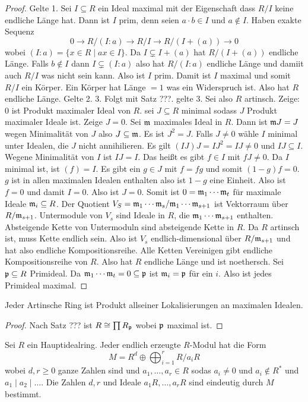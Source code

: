 \begin{proof}
    Gelte 1. Sei $I\subseteq R$ ein Ideal maximal mit der Eigenschaft dass $R/I$ keine endliche Länge hat. Dann ist $I$ prim, denn seien $a\cdot b\in I$ und $a\not\in I$. Haben exakte Sequenz
    $$0\to R/(I:a)\to R/I\to R/(I+(a))\to 0$$ wobei $(I:a)=\{x\in R\mid ax\in I\}$. Da $I\subsetneq I+(a)$ hat $R/(I+(a))$ endliche Länge. Falls $b\not\in I$ dann $I\subsetneq (I:a)$ also hat $R/(I:a)$ endliche Länge und damiit auch $R/I$ was nicht sein kann. Also ist $I$ prim. Damit ist $I$ maximal und somit $R/I$ ein Körper. Ein Körper hat Länge $=1$ was ein Widerspruch ist.
    Also hat $R$ endliche Länge.
    Gelte 2. 3. Folgt mit Satz ???. gelte 3. Sei also $R$ artinsch. Zeige: $0$ ist Produkt maximaler Ideal von $R$.
    sei $J\subseteq R$ minimal sodass $J$ Produkt maximaler Ideale ist. Zeige $J=0$.
    Sei $\mathfrak{m} $ maximales Ideal in $R$. Dann ist $\mathfrak{m} J=J$ wegen Minimalität von $J$ also $J\subseteq \mathfrak{m}$. Es ist $J^2=J$.
    Falls $J\neq 0$ wähle $I$ minimal unter Idealen, die $J$ nicht annihilieren.
    Es gilt $(IJ)J=IJ^2=IJ\neq 0$ und $IJ\subseteq I$. Wegene Minimalität von $I$ ist $IJ=I$. Das heißt es gibt $f\in I$ mit $fJ\neq 0$. Da $I$ minimal ist, ist $(f)=I$. Es gibt ein $g\in J$ mit $f=fg$ und somit $(1-g)f=0$.
    $g$ ist in allen maximalen Idealen enthalten also ist $1-g$ eine Einheit. Also ist $f=0$ und damit $I=0$. Also ist $J=0$.
    Somit ist $0=\mathfrak{m}_1\cdots \mathfrak{m}_t$ für maximale Ideale $\mathfrak{m}_i\subseteq R$.
    Der Quotient $V_S=\mathfrak{m}_1\cdots \mathfrak{m}_s/\mathfrak{m}_1\cdots \mathfrak{m}_{s+1}$ ist Vektorraum über $R/\mathfrak{m}_{s+1}$. Untermodule von $V_s$ sind Ideale in $R$, die $\mathfrak{m}_1\cdots \mathfrak{m}_{s+1}$ enthalten.
    Absteigende Kette von Untermoduln sind absteigende Kette in $R$. Da $R$ artinsch ist, muss Kette endlich sein.
    Also ist $V_s$ endlich-dimensional über $R/\mathfrak{m}_{s+1}$ und hat also endliche Kompositionsreihe. Alle Ketten Vereinigen gibt endliche Kompositionsreihe von $R$. Also hat $R$ endliche Länge und ist noethersch. Sei $\mathfrak{p}\subseteq R$ Primideal. Da $\mathfrak{m}_1\cdots \mathfrak{m}_t=0\subseteq \mathfrak{p}$ ist $\mathfrak{m}_i=\mathfrak{p}$ für ein $i$. Also ist jedes Primideal maximal.
\end{proof}
\begin{Kor}
    Jeder Artinsche Ring ist Produkt allseiner Lokalisierungen an maximalen Idealen.
\end{Kor}
\begin{proof}
    Nach Satz ??? ist $R\cong \prod R_{\mathfrak{p}}$ wobei $\mathfrak{p}$ maximal ist.
\end{proof}
\begin{Satz}
    Sei $R$ ein Hauptidealring. Jeder endlich erzeugte $R$-Modul hat die Form
    $$M=R^d\oplus\bigoplus_{i=1}^rR/a_iR$$ wobei $d,r\geq 0$ ganze Zahlen sind und $a_1,\dots,a_r\in R$ sodas $a_i\neq 0$ und $a_i\not\in R^*$ und $a_1\mid a_2\mid \dots$. Die Zahlen $d,r$ und Ideale $a_1R,\dots,a_rR$ sind eindeutig durch $M$ bestimmt.
\end{Satz}

